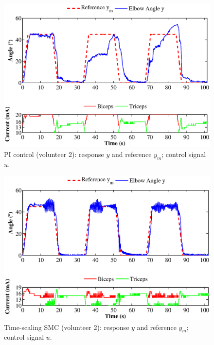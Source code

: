 \documentclass[review]{elsarticle}
\begin{document}
%
\begin{figure}[!htb]
\begin{center}
\includegraphics[width=12cm]{POV2604PI.eps}
\caption{PI control (volunteer 2): response $y$ and reference $y_m$; control signal $u$.}
\label{plot3}
\end{center}
\end{figure}
%
%
\begin{figure}[!htb]
\begin{center}
\includegraphics[width=12cm]{POV2604PIRele.eps}
\caption{Time-scaling SMC (volunteer 2): response $y$ and reference $y_m$; control signal $u$.}
\label{plot4}
\end{center}
\end{figure}
%
\end{document}
